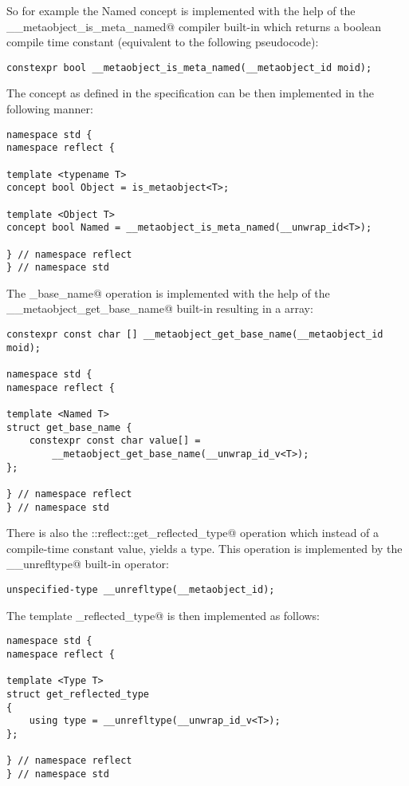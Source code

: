 So for example the Named concept is implemented with the help of
the \verb@__metaobject_is_meta_named@ compiler built-in which returns a boolean
compile time constant (equivalent to the following pseudocode):

\begin{verbatim}
constexpr bool __metaobject_is_meta_named(__metaobject_id moid);
\end{verbatim}

The concept as defined in the specification can be then implemented in the
following manner: 

\begin{verbatim}
namespace std {
namespace reflect {

template <typename T>
concept bool Object = is_metaobject<T>;

template <Object T>
concept bool Named = __metaobject_is_meta_named(__unwrap_id<T>);

} // namespace reflect
} // namespace std
\end{verbatim}

The \verb@get_base_name@ operation is implemented with the help of the
\verb@__metaobject_get_base_name@ built-in resulting in a \verb@constexpr@
\verb@char@ array: 

\begin{verbatim}
constexpr const char [] __metaobject_get_base_name(__metaobject_id moid);

namespace std {
namespace reflect {

template <Named T>
struct get_base_name {
	constexpr const char value[] =
		__metaobject_get_base_name(__unwrap_id_v<T>);
};

} // namespace reflect
} // namespace std
\end{verbatim}

There is also the \verb@std::reflect::get_reflected_type@ operation which instead
of a compile-time constant value, yields a type. This operation is implemented
by the \verb@__unrefltype@ built-in operator:

\begin{verbatim}
unspecified-type __unrefltype(__metaobject_id);
\end{verbatim}

The template \verb@get_reflected_type@ is then implemented as follows:

\begin{verbatim}
namespace std {
namespace reflect {

template <Type T>
struct get_reflected_type
{
	using type = __unrefltype(__unwrap_id_v<T>);
};

} // namespace reflect
} // namespace std
\end{verbatim}
